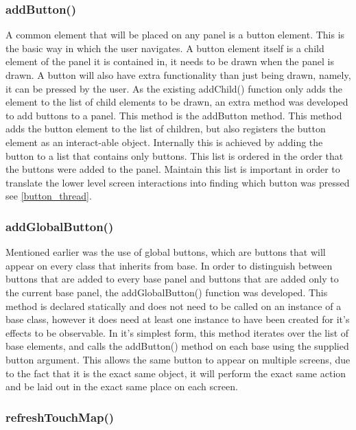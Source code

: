 \subsubsection{addButton()}

A common element that will be placed on any panel is a button element. This is the basic way in which the user navigates. A button element itself is a child element of the panel it is contained in, it needs to be drawn when the panel is drawn. A button will also have extra functionality than just being drawn, namely, it can be pressed by the user. As the existing addChild() function only adds the element to the list of child elements to be drawn, an extra method was developed to add buttons to a panel. This method is the addButton method. This method adds the button element to the list of children, but also registers the button element as an interact-able object. Internally this is achieved by adding the button to a list that contains only buttons. This list is ordered in the order that the buttons were added to the panel. Maintain this list is important in order to translate the lower level screen interactions into finding which button was pressed see \ref{button_thread}.

\subsubsection{addGlobalButton()}

Mentioned earlier was the use of global buttons, which are buttons that will appear on every class that inherits from base. In order to distinguish between buttons that are added to every base panel and buttons that are added only to the current base panel, the addGlobalButton() function was developed. This method is declared statically and does not need to be called on an instance of a base class, however it does need at least one instance to have been created for it's effects to be observable. In it's simplest form, this method iterates over the list of base elements, and calls the addButton() method on each base using the supplied button argument. This allows the same button to appear on multiple screens, due to the fact that it is the exact same object, it will perform the exact same action and be laid out in the exact same place on each screen.

\subsubsection{refreshTouchMap()}

